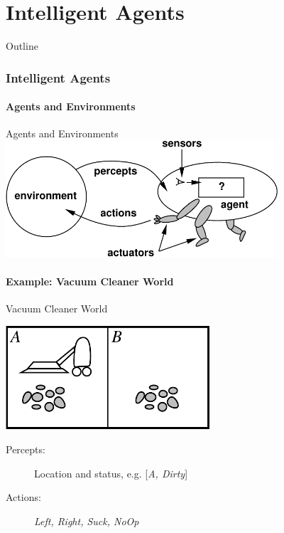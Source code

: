 \documentclass[12pt]{beamer}
\begin{document}
\part{Intelligent Agents}
\begin{frame}{Outline}
  \tableofcontents
\end{frame}

\section{Intelligent Agents}
\subsection{Agents and Environments}

\begin{frame}{Agents and Environments}
	\includegraphics[width=4in]{agent-environment.pdf}
\end{frame}

\subsection{Example: Vacuum Cleaner World}

\begin{frame}{Vacuum Cleaner World}
	\begin{center}
		\includegraphics[width=3in]{vacuum-environment.pdf}
	\end{center}
	\begin{description}
		\item[Percepts:] Location and status, e.g. [\textit{A, Dirty}]
		\item[Actions:] \textit{Left, Right, Suck, NoOp}
	\end{description}
\end{frame}
\end{document}
